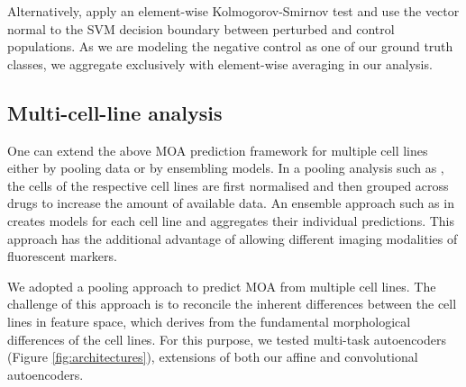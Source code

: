 Alternatively, \cite{perlman2004multidimensional} apply an element-wise Kolmogorov-Smirnov test and \cite{loo2007image} use the vector normal to the SVM decision boundary between perturbed and control populations. As we are modeling the negative control as one of our ground truth classes, we aggregate exclusively with element-wise averaging in our analysis.


\subsection{Multi-cell-line analysis}
\label{subsec:multi_cell_line_analysis}
One can extend the above MOA prediction framework for multiple cell lines either by pooling data or by ensembling models. In a pooling analysis such as \cite{warchal2016development}, the cells of the respective cell lines are first normalised and then grouped across drugs to increase the amount of available data.
An ensemble approach such as in \cite{rose2018compound} creates models for each cell line and aggregates their individual predictions. This approach has the additional advantage of allowing different imaging modalities of fluorescent markers.

    We adopted a pooling approach to predict MOA from multiple cell lines. The challenge of this approach is to reconcile the inherent differences between the cell lines in feature space, which derives from the fundamental morphological differences of the cell lines. For this purpose, we tested multi-task autoencoders (Figure \ref{fig:architectures}), extensions of both our affine and convolutional autoencoders.
    

